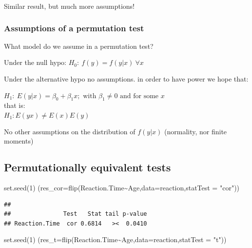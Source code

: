 \documentclass[
]{article}
\newenvironment{Shaded}{\begin{snugshade}}{\end{snugshade}}
\newcommand{\AttributeTok}[1]{\textcolor[rgb]{0.77,0.63,0.00}{#1}}
\newcommand{\DecValTok}[1]{\textcolor[rgb]{0.00,0.00,0.81}{#1}}
\newcommand{\FunctionTok}[1]{\textcolor[rgb]{0.00,0.00,0.00}{#1}}
\newcommand{\NormalTok}[1]{#1}
\newcommand{\SpecialCharTok}[1]{\textcolor[rgb]{0.00,0.00,0.00}{#1}}
\newcommand{\StringTok}[1]{\textcolor[rgb]{0.31,0.60,0.02}{#1}}
\begin{document}
Similar result, but much more assumptions!

\hypertarget{assumptions-of-a-permutation-test}{%
\subsubsection{Assumptions of a permutation
test}\label{assumptions-of-a-permutation-test}}

What model do we assume in a permutation test?

Under the null hypo: \(H_0:\ f(y)=f(y|x) \ \forall x\)

Under the alternative hypo no assumptions. in order to have power we
hope that:

\(H_1:\ E(y|x)=\beta_0 + \beta_1x; \textrm{ with } \beta_1\neq 0 \textrm{ and for some } x\)\\
that is:\\
\(H_1: E(yx)\neq E(x)E(y)\)

No other assumptions on the distribution of \(f(y|x)\) (normality, nor
finite moments)

\hypertarget{permutationally-equivalent-tests}{%
\subsection{Permutationally equivalent
tests}\label{permutationally-equivalent-tests}}

\begin{Shaded}
\begin{Highlighting}[]
\FunctionTok{set.seed}\NormalTok{(}\DecValTok{1}\NormalTok{)}
\NormalTok{(}\AttributeTok{res\_cor=}\FunctionTok{flip}\NormalTok{(Reaction.Time}\SpecialCharTok{\textasciitilde{}}\NormalTok{Age,}\AttributeTok{data=}\NormalTok{reaction,}\AttributeTok{statTest =} \StringTok{"cor"}\NormalTok{))}
\end{Highlighting}
\end{Shaded}

\begin{verbatim}
## 
##               Test   Stat tail p-value
## Reaction.Time  cor 0.6814   ><  0.0410
\end{verbatim}

\begin{Shaded}
\begin{Highlighting}[]
\FunctionTok{set.seed}\NormalTok{(}\DecValTok{1}\NormalTok{)}
\NormalTok{(}\AttributeTok{res\_t=}\FunctionTok{flip}\NormalTok{(Reaction.Time}\SpecialCharTok{\textasciitilde{}}\NormalTok{Age,}\AttributeTok{data=}\NormalTok{reaction,}\AttributeTok{statTest =} \StringTok{"t"}\NormalTok{))}
\end{Highlighting}
\end{Shaded}
\end{document}
